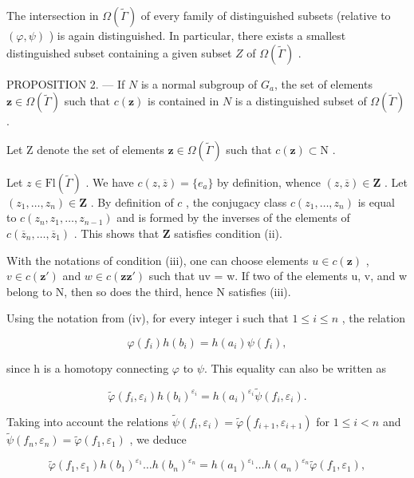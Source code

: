 The intersection in \(\Omega(\widetilde{\Gamma})\) of every family of distinguished subsets (relative to \((\varphi, \psi)\) ) is again distinguished. In particular, there exists a smallest distinguished subset containing a given subset \(Z\) of \(\Omega(\widetilde{\Gamma})\) .

PROPOSITION 2. --- If \(N\) is a normal subgroup of \(G_{a}\), the set of elements \(\mathbf{z} \in \Omega(\widetilde{\Gamma})\) such that \(c(\mathbf{z})\) is contained in \(N\) is a distinguished subset of \(\Omega(\widetilde{\Gamma})\).

Let Z denote the set of elements \(\mathbf{z} \in \Omega(\widetilde{\Gamma})\) such that \(c(\mathbf{z}) \subset \mathrm{N}\) .

Let \(z \in \mathrm{Fl}(\widetilde{\Gamma})\) . We have \(c(z, \overline{z}) = \{e_a\}\) by definition, whence \((z, \overline{z}) \in \mathbf{Z}\) . Let \((z_1, \ldots, z_n) \in \mathbf{Z}\) . By definition of \(c\) , the conjugacy class \(c(z_1, \ldots, z_n)\) is equal to \(c(z_n, z_1, \ldots, z_{n-1})\) and is formed by the inverses of the elements of \(c(\overline{z}_n, \ldots, \overline{z}_1)\) . This shows that \(\mathbf{Z}\) satisfies condition (ii).

With the notations of condition (iii), one can choose elements \(u \in c(\mathbf{z})\) , \(v \in c(\mathbf{z}')\) and \(w \in c(\mathbf{z}\mathbf{z}')\) such that uv = w. If two of the elements u, v, and w belong to N, then so does the third, hence N satisfies (iii).

Using the notation from (iv), for every integer i such that \(1 \leqslant i \leqslant n\) , the relation

\[
  \varphi (f _ {i}) h (b _ {i}) = h (a _ {i}) \psi (f _ {i}),
\]

since h is a homotopy connecting \(\varphi\) to \(\psi\). This equality can also be written as

\[
\widetilde {\varphi} (f _ {i}, \varepsilon_ {i}) h (b _ {i}) ^ {\varepsilon_ {i}} = h (a _ {i}) ^ {\varepsilon_ {i}} \widetilde {\psi} (f _ {i}, \varepsilon_ {i}).
\]

Taking into account the relations \(\widetilde{\psi}(f_i,\varepsilon_i) = \widetilde{\varphi}(f_{i + 1},\varepsilon_{i + 1})\) for \(1\leqslant i <   n\) and \(\widetilde{\psi} (f_n,\varepsilon_n) = \widetilde{\varphi} (f_1,\varepsilon_1)\) , we deduce

\[
\widetilde {\varphi} (f _ {1}, \varepsilon_ {1}) h (b _ {1}) ^ {\varepsilon_ {1}} \dots h (b _ {n}) ^ {\varepsilon_ {n}} = h (a _ {1}) ^ {\varepsilon_ {1}} \dots h (a _ {n}) ^ {\varepsilon_ {n}} \widetilde {\varphi} (f _ {1}, \varepsilon_ {1}),
\]


